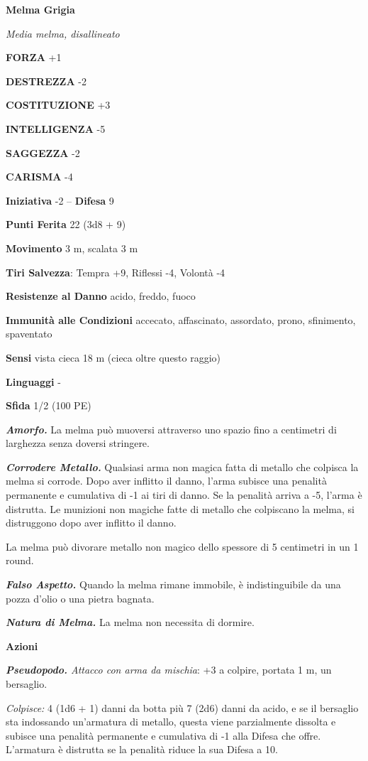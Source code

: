 \begin{multicols}{2}
\medskip{}\textbf{Melma Grigia}

\emph{Media melma, disallineato}

\textbf{FORZA} +1

\textbf{DESTREZZA} -2

\textbf{COSTITUZIONE} +3

\textbf{INTELLIGENZA} -5

\textbf{SAGGEZZA} -2

\textbf{CARISMA} -4

\textbf{Iniziativa} -2 -- \textbf{Difesa} 9

\textbf{Punti Ferita} 22 (3d8 + 9)

\textbf{Movimento} 3 m, scalata 3 m

\textbf{Tiri Salvezza}: Tempra +9, Riflessi -4, Volontà -4

\textbf{Resistenze al Danno} acido, freddo, fuoco

\textbf{Immunità alle Condizioni} accecato, affascinato, assordato, prono, sfinimento, spaventato

\textbf{Sensi} vista cieca 18 m (cieca oltre questo raggio)

\textbf{Linguaggi} -

\textbf{Sfida} 1/2 (100 PE)

\emph{\textbf{Amorfo.}} La melma può muoversi attraverso uno spazio fino a  centimetri di larghezza senza doversi stringere.

\emph{\textbf{Corrodere Metallo.}} Qualsiasi arma non magica fatta di metallo che colpisca la melma si corrode. Dopo aver inflitto il danno, l'arma subisce una penalità permanente e cumulativa di -1 ai tiri di danno. Se la penalità arriva a -5, l'arma è distrutta. Le munizioni non magiche fatte di metallo che colpiscano la melma, si distruggono dopo aver inflitto il danno.

La melma può divorare metallo non magico dello spessore di 5 centimetri in un 1 round.

\emph{\textbf{Falso Aspetto.}} Quando la melma rimane immobile, è indistinguibile da una pozza d'olio o una pietra bagnata.

\emph{\textbf{Natura di Melma.}} La melma non necessita di dormire.

\textbf{Azioni}

\emph{\textbf{Pseudopodo.} Attacco con arma da mischia}: +3 a colpire, portata 1 m, un bersaglio.

\emph{Colpisce:} 4 (1d6 + 1) danni da botta più 7 (2d6) danni da acido, e se il bersaglio sta indossando un'armatura di metallo, questa viene parzialmente dissolta e subisce una penalità permanente e cumulativa di -1 alla Difesa che offre. L'armatura è distrutta se la penalità riduce la sua Difesa a 10.


\end{multicols}
